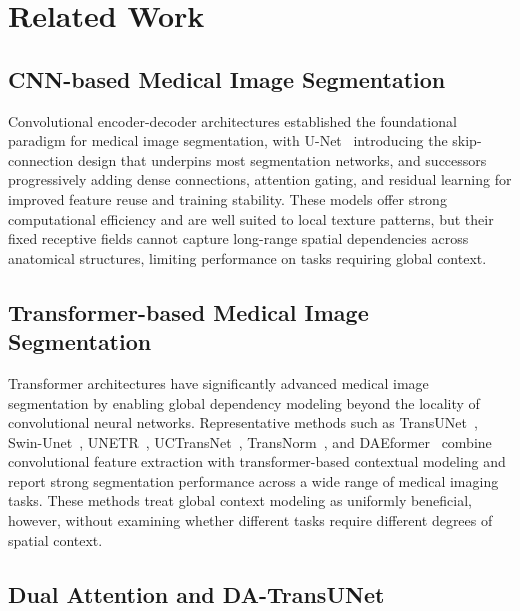\section{Related Work}
\label{sec:related_work}

\subsection{CNN-based Medical Image Segmentation}

Convolutional encoder-decoder architectures established the foundational paradigm for medical image segmentation, with U-Net~\cite{ronneberger2015unet} introducing the skip-connection design that underpins most segmentation networks, and successors~\cite{zhou2018unetpp,oktay2018attention,diakogiannis2020resunet,ibtehaz2020multiresunet} progressively adding dense connections, attention gating, and residual learning for improved feature reuse and training stability. These models offer strong computational efficiency and are well suited to local texture patterns, but their fixed receptive fields cannot capture long-range spatial dependencies across anatomical structures, limiting performance on tasks requiring global context.

\subsection{Transformer-based Medical Image Segmentation}

Transformer architectures have significantly advanced medical image segmentation by enabling global dependency modeling beyond the locality of convolutional neural networks. Representative methods such as TransUNet~\cite{chen2021transunet}, Swin-Unet~\cite{cao2022swinunet}, UNETR~\cite{hatamizadeh2022unetr}, UCTransNet~\cite{wang2022uctransnet}, TransNorm~\cite{azad2022transnorm}, and DAEformer~\cite{azad2023daeformer} combine convolutional feature extraction with transformer-based contextual modeling and report strong segmentation performance across a wide range of medical imaging tasks. These methods treat global context modeling as uniformly beneficial, however, without examining whether different tasks require different degrees of spatial context.

\subsection{Dual Attention and DA-TransUNet}

